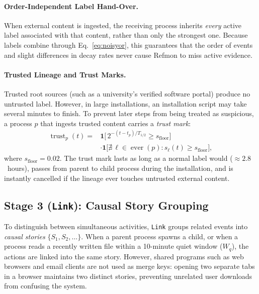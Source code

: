 \documentclass[10pt,twocolumn,letterpaper]{article}
\makeatletter
\theoremstyle{plain}
\theoremstyle{definition}
\theoremstyle{remark}
\DeclareRobustCommand{\_}{\ifmmode\nfss@text{\textunderscore}\else\textunderscore\penalty\@highpenalty\hskip\z@skip\fi}
\makeatother
\begin{document}
\paragraph{Order-Independent Label Hand-Over.} When external content is ingested, the receiving process inherits \emph{every} active label associated with that content, rather than only the strongest one. Because labels combine through Eq.~\eqref{eq:noisyor}, this guarantees that the order of events and slight differences in decay rates never cause Refmon to miss active evidence.

\paragraph{Trusted Lineage and Trust Marks.} Trusted root sources (such as a university's verified software portal) produce no untrusted label. However, in large installations, an installation script may take several minutes to finish. To prevent later steps from being treated as suspicious, a process $p$ that ingests trusted content carries a \emph{trust mark}:
\begin{equation}
  \begin{aligned}
  \operatorname{trust}_p(t) = {}&\mathbf{1}\!\Big[\,2^{-(t - t_p)/T_{1/2}} \ge s_{\text{floor}}\Big]\\
  &\cdot \mathbf{1}\!\Big[\nexists\, \ell \in \operatorname{ever}(p) : s_\ell(t) \ge s_{\text{floor}}\Big],
  \end{aligned}
  \label{eq:trust}
\end{equation}
where $s_{\text{floor}} = 0.02$. The trust mark lasts as long as a normal label would ($\approx 2.8$~hours), passes from parent to child process during the installation, and is instantly cancelled if the lineage ever touches untrusted external content.

\subsection{Stage 3 (\texttt{Link}): Causal Story Grouping}
\label{sec:link}

To distinguish between simultaneous activities, \texttt{Link} groups related events into \emph{causal stories} $\{S_1, S_2, \dots\}$. When a parent process spawns a child, or when a process reads a recently written file within a 10-minute quiet window ($W_q$), the actions are linked into the same story. However, shared programs such as web browsers and email clients are not used as merge keys: opening two separate tabs in a browser maintains two distinct stories, preventing unrelated user downloads from confusing the system.
\end{document}
